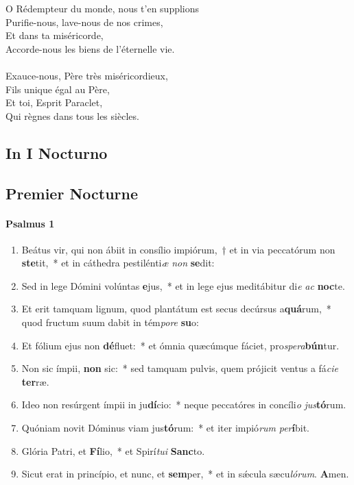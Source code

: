 \documentclass[twoside]{article}
\begin{document}
\begin{paracol}[1]{2}
\newpage
\vspace*{3cm}
O Rédempteur du monde, nous t'en supplions\\
Purifie-nous, lave-nous de nos crimes,\\
Et dans ta miséricorde,\\
Accorde-nous les biens de l'éternelle vie.\\
\\
Exauce-nous, Père très miséricordieux,\\
Fils unique égal au Père,\\
Et toi, Esprit Paraclet,\\
Qui règnes dans tous les siècles.

\switchcolumn*

\subsection{In I Nocturno}

\switchcolumn

\subsection{Premier Nocturne}

\switchcolumn*

\paragraph{Psalmus 1}


\begin{enumerate}[wide, itemsep=0mm, labelwidth=!, labelindent=0pt, label=\color{gregoriocolor}\theenumi]
\item Beátus vir, qui non ábiit in consílio impiórum,~† et in via peccatórum non \textbf{ste}tit,~* et in cáthedra pestilénti\textit{æ} \textit{non} \textbf{se}dit:
\item Sed in lege Dómini volúntas \textbf{e}jus,~* et in lege ejus meditábitur di\textit{e} \textit{ac} \textbf{noc}te.
\item Et erit tamquam lignum, quod plantátum est secus decúrsus a\textbf{quá}rum,~* quod fructum suum dabit in tém\textit{po}\textit{re} \textbf{su}o:
\item Et fólium ejus non \textbf{dé}fluet:~* et ómnia quæcúmque fáciet, pro\textit{spe}\textit{ra}\textbf{bún}tur.
\item Non sic ímpii, \textbf{non} sic:~* sed tamquam pulvis, quem prójicit ventus a fá\textit{ci}\textit{e} \textbf{ter}ræ.
\item Ideo non resúrgent ímpii in ju\textbf{dí}cio:~* neque peccatóres in concíli\textit{o} \textit{jus}\textbf{tó}rum.
\item Quóniam novit Dóminus viam jus\textbf{tó}rum:~* et iter impió\textit{rum} \textit{per}\textbf{í}bit.
\item Glória Patri, et \textbf{Fí}lio,~* et Spirí\textit{tu}\textit{i} \textbf{Sanc}to.
\item Sicut erat in princípio, et nunc, et \textbf{sem}per,~* et in sǽcula sæcu\textit{ló}\textit{rum}. \textbf{A}men.
\end{enumerate}


\end{paracol}
\end{document}
